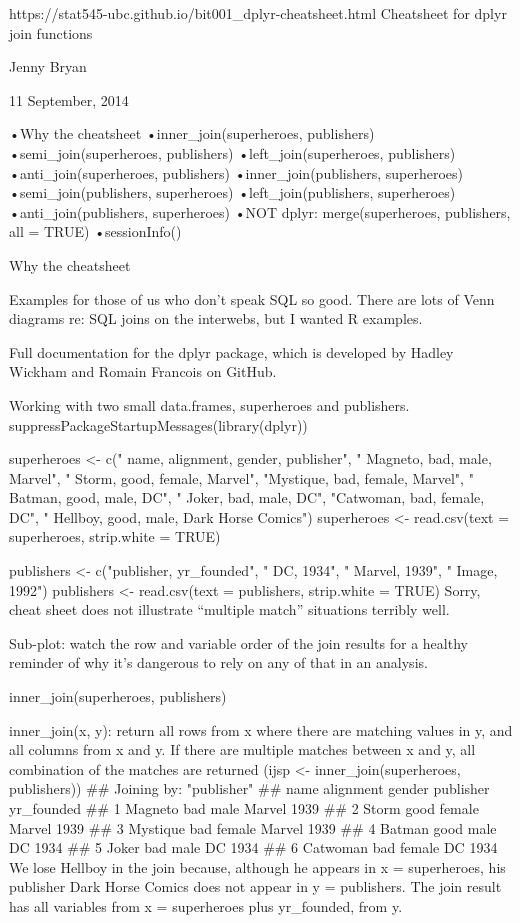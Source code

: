https://stat545-ubc.github.io/bit001_dplyr-cheatsheet.html
Cheatsheet for dplyr join functions
 
Jenny Bryan
 
11 September, 2014
 
•Why the cheatsheet
 •inner_join(superheroes, publishers)
 •semi_join(superheroes, publishers)
 •left_join(superheroes, publishers)
 •anti_join(superheroes, publishers)
 •inner_join(publishers, superheroes)
 •semi_join(publishers, superheroes)
 •left_join(publishers, superheroes)
 •anti_join(publishers, superheroes)
 •NOT dplyr: merge(superheroes, publishers, all = TRUE)
 •sessionInfo()
 

Why the cheatsheet
 
Examples for those of us who don’t speak SQL so good. There are lots of Venn diagrams re: SQL joins on the interwebs, but I wanted R examples.
 
Full documentation for the dplyr package, which is developed by Hadley Wickham and Romain Francois on GitHub.
 
Working with two small data.frames, superheroes and publishers.
 suppressPackageStartupMessages(library(dplyr))

superheroes <-
  c("    name, alignment, gender,         publisher",
    " Magneto,       bad,   male,            Marvel",
    "   Storm,      good, female,            Marvel",
    "Mystique,       bad, female,            Marvel",
    "  Batman,      good,   male,                DC",
    "   Joker,       bad,   male,                DC",
    "Catwoman,       bad, female,                DC",
    " Hellboy,      good,   male, Dark Horse Comics")
superheroes <- read.csv(text = superheroes, strip.white = TRUE)

publishers <- 
  c("publisher, yr_founded",
    "       DC,       1934",
    "   Marvel,       1939",
    "    Image,       1992")
publishers <- read.csv(text = publishers, strip.white = TRUE) 
Sorry, cheat sheet does not illustrate “multiple match” situations terribly well.
 
Sub-plot: watch the row and variable order of the join results for a healthy reminder of why it’s dangerous to rely on any of that in an analysis.
 

inner_join(superheroes, publishers)
 

inner_join(x, y): return all rows from x where there are matching values in y, and all columns from x and y. If there are multiple matches between x and y, all combination of the matches are returned
 (ijsp <- inner_join(superheroes, publishers)) ## Joining by: "publisher" ##       name alignment gender publisher yr_founded
## 1  Magneto       bad   male    Marvel       1939
## 2    Storm      good female    Marvel       1939
## 3 Mystique       bad female    Marvel       1939
## 4   Batman      good   male        DC       1934
## 5    Joker       bad   male        DC       1934
## 6 Catwoman       bad female        DC       1934 
We lose Hellboy in the join because, although he appears in x = superheroes, his publisher Dark Horse Comics does not appear in y = publishers. The join result has all variables from x = superheroes plus yr_founded, from y.
 



